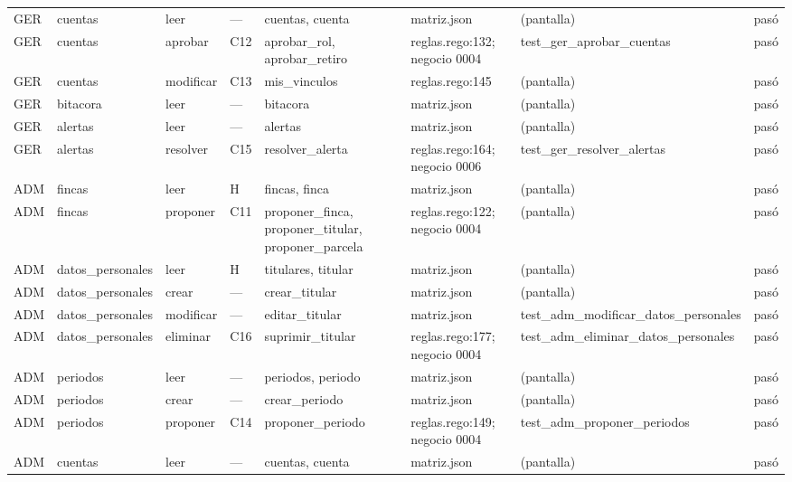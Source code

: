 \documentclass[11pt,letterpaper]{article}
\begin{document}
\begin{center}
\begin{longtable}{@{}p{0.6cm} p{1.7cm} p{1.2cm} p{0.9cm} p{3.4cm} p{2.6cm} p{3.4cm} p{0.8cm}@{}}
GER & cuentas & leer & — & cuentas, \allowbreak{}cuenta & matriz.json & (pantalla) & pasó \\
GER & cuentas & aprobar & C12 & aprobar\_rol, \allowbreak{}aprobar\_retiro & reglas.rego:132; negocio 0004 & test\_\allowbreak{}ger\_\allowbreak{}aprobar\_\allowbreak{}cuentas & pasó \\
GER & cuentas & modificar & C13 & mis\_vinculos & reglas.rego:145 & (pantalla) & pasó \\
GER & bitacora & leer & — & bitacora & matriz.json & (pantalla) & pasó \\
GER & alertas & leer & — & alertas & matriz.json & (pantalla) & pasó \\
GER & alertas & resolver & C15 & resolver\_alerta & reglas.rego:164; negocio 0006 & test\_\allowbreak{}ger\_\allowbreak{}resolver\_\allowbreak{}alertas & pasó \\
ADM & fincas & leer & H & fincas, \allowbreak{}finca & matriz.json & (pantalla) & pasó \\
ADM & fincas & proponer & C11 & proponer\_finca, \allowbreak{}proponer\_titular, \allowbreak{}proponer\_parcela & reglas.rego:122; negocio 0004 & (pantalla) & pasó \\
ADM & datos\_\allowbreak{}personales & leer & H & titulares, \allowbreak{}titular & matriz.json & (pantalla) & pasó \\
ADM & datos\_\allowbreak{}personales & crear & — & crear\_titular & matriz.json & (pantalla) & pasó \\
ADM & datos\_\allowbreak{}personales & modificar & — & editar\_titular & matriz.json & test\_\allowbreak{}adm\_\allowbreak{}modificar\_\allowbreak{}datos\_\allowbreak{}personales & pasó \\
ADM & datos\_\allowbreak{}personales & eliminar & C16 & suprimir\_titular & reglas.rego:177; negocio 0004 & test\_\allowbreak{}adm\_\allowbreak{}eliminar\_\allowbreak{}datos\_\allowbreak{}personales & pasó \\
ADM & periodos & leer & — & periodos, \allowbreak{}periodo & matriz.json & (pantalla) & pasó \\
ADM & periodos & crear & — & crear\_periodo & matriz.json & (pantalla) & pasó \\
ADM & periodos & proponer & C14 & proponer\_periodo & reglas.rego:149; negocio 0004 & test\_\allowbreak{}adm\_\allowbreak{}proponer\_\allowbreak{}periodos & pasó \\
ADM & cuentas & leer & — & cuentas, \allowbreak{}cuenta & matriz.json & (pantalla) & pasó \\

\end{longtable}
\end{center}
\end{document}
